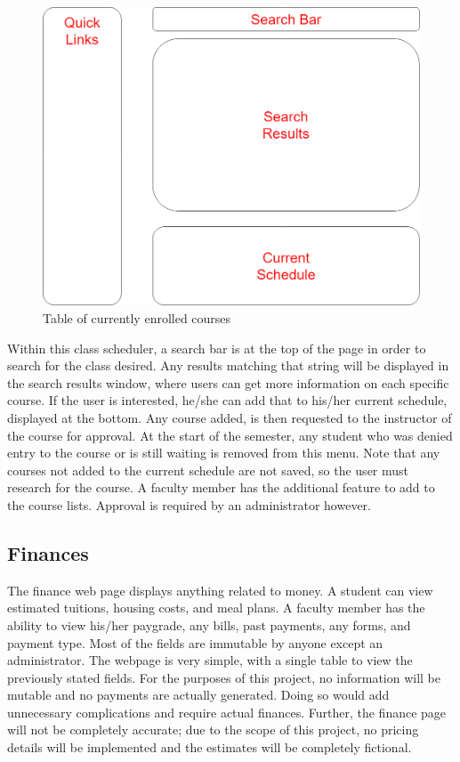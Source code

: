 \documentclass{article}
\begin{document}
      \begin{figure}[H]
        \centering
        \includegraphics[width=4 in]{Design/CourseScheduler}
        \caption{Table of currently enrolled courses}
        \label{fig:CSchedule-Tasks}
      \end{figure}

      Within this class scheduler, a search bar is at the top of the page in order to search for the class desired.  Any results matching that string will be displayed in the search results window, where users can get more information on each specific course.  If the user is interested, he/she can add that to his/her current schedule, displayed at the bottom.  Any course added, is then requested to the instructor of the course for approval.  At the start of the semester, any student who was denied entry to the course or is still waiting is removed from this menu.  Note that any courses not added to the current schedule are not saved, so the user must research for the course.  A faculty member has the additional feature to add to the course lists.  Approval is required by an administrator however.

    \subsection{Finances}
      The finance web page displays anything related to money.  A student can view estimated tuitions, housing costs, and meal plans.  A faculty member has the ability to view his/her paygrade, any bills, past payments, any forms, and payment type.  Most of the fields are immutable by anyone except an administrator.  The webpage is very simple, with a single table to view the previously stated fields.
      \newline\newline
      For the purposes of this project, no information will be mutable and no payments are actually generated.  Doing so would add unnecessary complications and require actual finances.  Further, the finance page will not be completely accurate; due to the scope of this project, no pricing details will be implemented and the estimates will be completely fictional.
\end{document}
